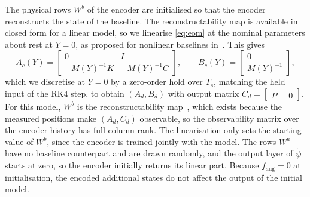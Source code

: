 The physical rows $W^b$ of the encoder are initialised so that the encoder
reconstructs the state of the baseline.
The reconstructability map is available in closed form for a linear model,
so we linearise \eqref{eq:eom} at the nominal parameters about rest at $Y=0$,
as proposed for nonlinear baselines in~\cite[Sec.~3.1]{hoekstra2026encoder}.
This gives
\begin{equation}
 A_c(Y)=\begin{bmatrix}0 & I\\ -M(Y)^{-1}K & -M(Y)^{-1}C\end{bmatrix},\qquad
 B_c(Y)=\begin{bmatrix}0\\ M(Y)^{-1}\end{bmatrix},
\label{eq:aug_lin}
\end{equation}
which we discretise at $Y=0$ by a zero-order hold over $T_s$, matching the
held input of the RK4 step, to obtain $(A_d,B_d)$ with output matrix
$C_d=\begin{bmatrix}P^\top & 0\end{bmatrix}$.
For this model, $W^b$ is the reconstructability
map~\cite[Eqs.~(16), (17)]{hoekstra2026encoder}, which exists because the
measured positions make $(A_d,C_d)$ observable, so the observability matrix
over the encoder history has full column rank.
The linearisation only sets the starting value of $W^b$, since the encoder
is trained jointly with the model.
The rows $W^a$ have no baseline counterpart and are drawn randomly, and the
output layer of $\tilde\psi$ starts at zero, so the encoder initially
returns its linear part.
Because $f_{\mathrm{aug}}=0$ at initialisation, the encoded additional
states do not affect the output of the initial model.
